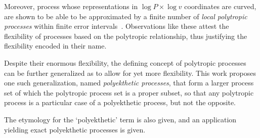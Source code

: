     Moreover, process whose representations in $\log P \times \log v$  coordinates  are  curved,
    are shown to be able to be  approximated  by  a  finite  number  of  \emph{local  polytropic
    processes} within  finite  error  intervals~\cite{2020-NaaktgeborenC-engrXiv}.  Observations
    like these attest the flexibility of processes based on the  polytropic  relationship,  thus
    justifying the flexibility encoded in their name.

    Despite their enormous flexibility, the defining concept  of  polytropic  processes  can  be
    further generalized as to allow for yet  more  flexibility.  This  work  proposes  one  such
    generalization, named \emph{polyekthetic processes}, that form a larger process set of which
    the polytropic process set is  a  proper  subset,  so  that  any  polytropic  process  is  a
    particular case of a polyekthetic process, but not the opposite.

    The etymology for the `polyekthetic' term is also given, and an application  yielding  exact
    polyekthetic processes is given.


